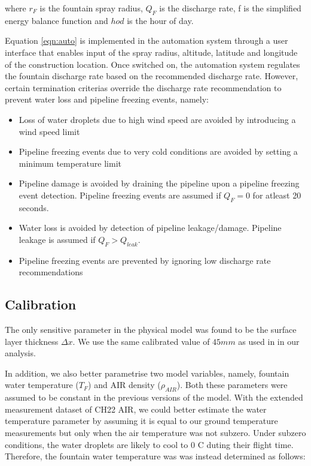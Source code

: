 \documentclass[tc, manuscript]{copernicus}
\begin{document}
where $r_F$ is the fountain spray radius, $Q_{F}$ is the discharge rate, f is the simplified energy balance
function and $hod$ is the hour of day.

Equation \ref{eqn:auto} is implemented in the automation system through a user interface that enables input of
the spray radius, altitude, latitude and longitude of the construction location. Once switched on, the
automation system regulates the fountain discharge rate based on the recommended discharge rate. However,
certain termination criterias override the discharge rate recommendation to prevent water loss and pipeline
freezing events, namely: 

\begin{itemize}

\item Loss of water droplets due to high wind speed are avoided by introducing a wind speed limit 

\item Pipeline freezing events due to very cold conditions are avoided by setting a minimum temperature limit 

\item Pipeline damage is avoided by draining the pipeline upon a pipeline freezing event detection. Pipeline
  freezing events are assumed if $Q_F = 0$ for atleast 20 seconds.

\item Water loss is avoided by detection of pipeline leakage/damage. Pipeline leakage is assumed if $Q_F > Q_{leak}$. 

\item Pipeline freezing events are prevented by ignoring low discharge rate recommendations  

\end{itemize}

\subsection{Calibration}
The only sensitive parameter in the physical model was found to be the surface layer thickness $\Delta x$. We
use the same calibrated value of $45 mm$ as used in \cite{balasubramanianInfluenceMeteorologicalConditions2022}
in our analysis. 

In addition, we also better parametrise two model variables, namely, fountain water temperature
($T_F$) and AIR density ($\rho_{AIR}$). Both these parameters were assumed to be constant in the previous
versions of the model. With the extended measurement dataset of CH22 AIR, we could better estimate the water
temperature parameter by assuming it is equal to our ground temperature measurements but only when the air
temperature was not subzero. Under subzero conditions, the water droplets are likely to cool to 0 C duting their
flight time. Therefore, the fountain water temperature was was instead determined as follows:
\end{document}
